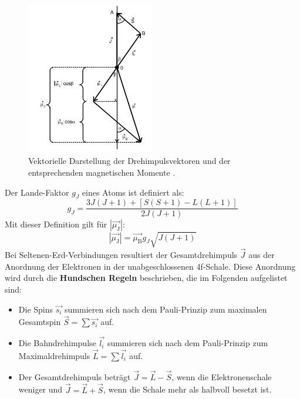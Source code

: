 \begin{figure}[H]
    \centering
    \includegraphics[width=0.5\textwidth]{content/vektoren.JPG}
    \caption{Vektorielle Darstellung der Drehimpulsvektoren und der entsprechenden
    magnetischen Momente \cite{versuchsanleitung}.}
    \label{fig:vektor}
  \end{figure}
\noindent Der Lande-Faktor $g_J$ eines Atoms ist definiert als:
\begin{equation}
    g_J = \frac{3J(J+1) + [S(S+1) - L(L+1)]} {2 J(J+1)}
\end{equation}
Mit dieser Definition gilt für $|\vec{\mu_\text{J}}|$:
\begin{equation}
    |\vec{\mu_\text{J}}| = \vec{\mu_\text{B}} g_J \sqrt{J (J+1)} 
\end{equation}
Bei Seltenen-Erd-Verbindungen resultiert der Gesamtdrehimpuls $\vec{J}$ aus der Anordnung der Elektronen in der unabgeschlossenen 4f-Schale. Diese Anordnung wird durch die \textbf{Hundschen Regeln} beschrieben, die im Folgenden aufgelistet sind:

\begin{itemize}
    \item Die Spins $\vec{s_i}$ summieren sich nach dem Pauli-Prinzip zum maximalen Gesamtspin
    $\vec{S} = \sum \vec{s_i}$ auf.
    \item Die Bahndrehimpulse $\vec{l_i}$ summieren sich nach dem Pauli-Prinzip zum Maximaldrehimpuls 
    $\vec{L} = \sum \vec{l_i}$ auf.
    \item Der Gesamtdrehimpuls beträgt $\vec{J} = \vec{L} - \vec{S}$, wenn die Elektronenschale weniger und
    $\vec{J} = \vec{L} + \vec{S}$, wenn die Schale mehr als halbvoll besetzt ist.
\end{itemize}

